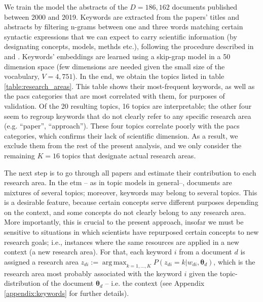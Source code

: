 \documentclass{article}
\DeclareMathOperator*{\argmax}{arg\,max}
\begin{document}
We train the model the abstracts of the $D=186,162$ documents published between 2000 and 2019. Keywords are extracted from the papers' titles and abstracts by filtering n-grams between one and three words matching certain syntactic expressions that we can expect to carry scientific information (by designating concepts, models, methds etc.), following the procedure described in \citealt{Gautheron2023} and \citealt{omodei_tel-01097702}. Keywords' embeddings are learned using a skip-grap model in a 50 dimension space (few dimensions are needed given the small size of the vocabulary, $V=4,751$). In the end, we obtain the topics listed in table \ref{table:research_areas}. This table shows their most-frequent keywords, as well as the \gls{pacs} categories that are most correlated with them, for purposes of validation. Of the 20 resulting topics, 16 topics are interpretable; the other four seem to regroup keywords that do not clearly refer to any specific research area (e.g. ``paper'', ``approach''). These four topics correlate poorly with the \gls{pacs} categories, which confirms their lack of scientific dimension. As a result, we exclude them from the rest of the present analysis, and we only consider the remaining $K=16$ topics that designate actual research areas.

The next step is to go through all papers and estimate their contribution to each research area. In the \gls{etm} -- as in topic models in general--, documents are mixtures of several topics; moreover, keywords may belong to several topics. This is a desirable feature, because certain concepts serve different purposes depending on the context, and some concepts do not clearly belong to any research area. More importantly, this is crucial to the present approach, insofar we must be sensitive to situations in which scientists have repurposed certain concepts to new research goals; i.e., instances where the same resources are applied in a new context (a new research area). %
For that, each keyword $i$ from a document $d$ is assigned a research area $z_{di} := \argmax_{k=1,\dots,K} P(z_{di}=k|w_{di},\bm{\theta}_{d})$, which is the research area most probably associated with the keyword $i$ given the topic-distribution of the document $\bm{\theta}_d$ -- i.e. the context (see Appendix \ref{appendix:keywords} for further details).
\end{document}
